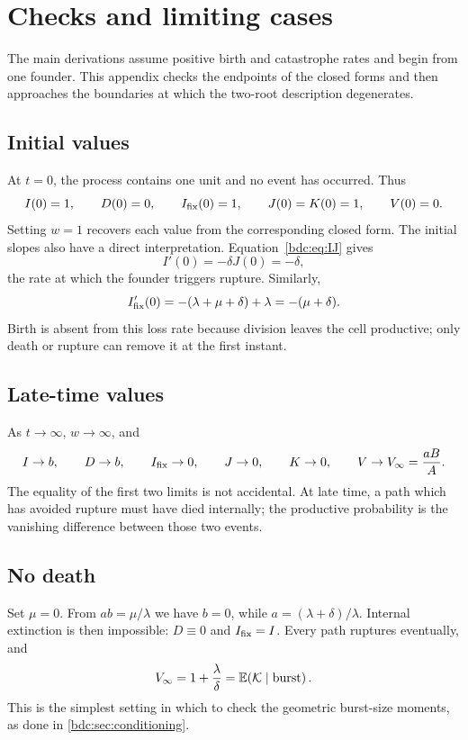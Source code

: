 \renewcommand{\thesection}{\thechapter.\Alph{section}}
\setcounter{section}{0}

\section{Checks and limiting cases}
\label{bdc:app:limits}

The main derivations assume positive birth and catastrophe rates and begin from
one founder. This appendix checks the endpoints of the closed forms and then
approaches the boundaries at which the two-root description degenerates.

\subsection{Initial values}
\label{bdc:app:initial}

At $t=0$, the process contains one unit and no event has occurred. Thus
\[
I(0)=1,\qquad D(0)=0,\qquad I_{\mathrm{fix}}(0)=1,\qquad
J(0)=K(0)=1,\qquad V(0)=0.
\]
Setting $w=1$ recovers each value from the corresponding closed form. The
initial slopes also have a direct interpretation. Equation~\cref{bdc:eq:IJ}
gives
\[
I'(0)=-\delta J(0)=-\delta,
\]
the rate at which the founder triggers rupture. Similarly,
\[
I_{\mathrm{fix}}'(0)=-(\lambda+\mu+\delta)+\lambda=-(\mu+\delta).
\]
Birth is absent from this loss rate because division leaves the cell productive;
only death or rupture can remove it at the first instant.

\subsection{Late-time values}
\label{bdc:app:late}

As $t\to\infty$, $w\to\infty$, and
\[
I\to b,\qquad D\to b,\qquad I_{\mathrm{fix}}\to0,\qquad
J\to0,\qquad K\to0,\qquad
V\to V_\infty=\frac{aB}{A}.
\]
The equality of the first two limits is not accidental. At late time, a path
which has avoided rupture must have died internally; the productive probability
is the vanishing difference between those two events.

\subsection{No death}
\label{bdc:app:nodeath}

Set $\mu=0$. From $ab=\mu/\lambda$ we have $b=0$, while
$a=(\lambda+\delta)/\lambda$. Internal extinction is then impossible:
$D\equiv0$ and $I_{\mathrm{fix}}=I$. Every path ruptures eventually, and
\[
V_\infty=1+\frac{\lambda}{\delta}
=\mathbb{E}\!\left(\mathcal{K}\mid\text{burst}\right).
\]
This is the simplest setting in which to check the geometric burst-size moments,
as done in \cref{bdc:sec:conditioning}.

